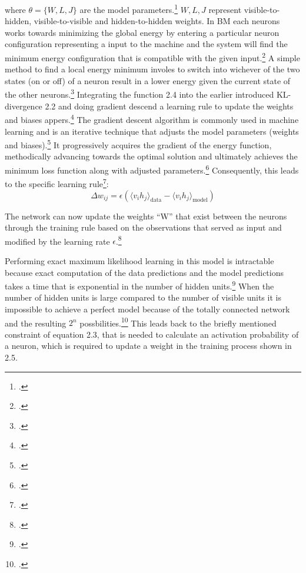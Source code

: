 where \( \theta = \{W, L, J\} \) are the model parameters.\footcite[cf.][448]{salakhutdinovDeepBoltzmannMachines2009}
\( W, L, J \) represent visible-to-hidden, visible-to-visible and hidden-to-hidden weights.
In \ac{BM} each neurons works towards minimizing the global energy by 
entering a particular neuron configuration representing a input to the machine and the system will find the minimum energy configuration that is compatible with the given input.\footcite[cf.][150]{ackleyLearningAlgorithmBoltzmann1985}
A simple method to find a local energy minimum involes to switch into wichever of the two states (on or off) of a neuron result in a lower energy given the current state of the other neurons.\footcite[cf.][110]{fahlmanMassivelyParallelArchitectures1983}    
Integrating the function 2.4 into the earlier introduced KL-divergence 2.2 and doing gradient descend a learning rule to update the weights and biases appers.\footcite[cf.][5]{hintonPracticalGuideTraining2012}
The gradient descent algorithm is commonly used in machine learning and is an iterative technique that adjusts the model parameters (weights and biases).\footcite[cf.][11]{wangResearchApplicationGradient2021}
It progressively acquires the gradient of the energy function, methodically advancing towards the optimal solution and ultimately achieves the minimum loss function along with adjusted parameters.\footcite[cf.][11]{wangResearchApplicationGradient2021}
Consequently, this leads to the specific learning rule\footcite[cf.][5]{hintonPracticalGuideTraining2012}:
\begin{equation}
    \Delta w_{ij} = \epsilon ( \langle v_i h_j \rangle_{\text{data}} - \langle v_i h_j \rangle_{\text{model}} )
\end{equation}

The network can now update the weights ``W'' that exist between the neurons through the training rule based on the observations that served as input and modified by the learning rate \(\epsilon\).\footcite[cf.][1-2]{barraEquivalenceHopfieldNetworks2012}

Performing exact maximum likelihood learning in this model is intractable because exact computation of the data predictions and the model predictions takes a time that is exponential in the number of hidden units.\footcite[cf.][449]{salakhutdinovDeepBoltzmannMachines2009}
When the number of hidden units is large compared to the number of visible units it is impossible to achieve a perfect model because of the totally connected network and the resulting \( 2^n \) possbilities.\footcite[cf.][154]{ackleyLearningAlgorithmBoltzmann1985}
This leads back to the briefly mentioned constraint of equation 2.3, that is needed to calculate an activation probability of a neuron, which is required to update a weight in the training process shown in 2.5.

